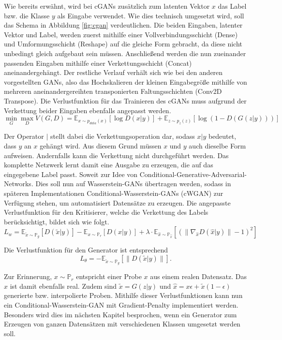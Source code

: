 Wie bereits erwähnt, wird bei cGANs zusätzlich zum latenten Vektor $x$ das Label
bzw. die Klasse $y$ als Eingabe verwendet. Wie dies technisch umgesetzt wird,
soll das Schema in Abbildung \ref{fig:cgan} verdeutlichen. Die beiden Eingaben,
latenter Vektor und Label, werden zuerst mithilfe einer Vollverbindungsschicht
(Dense) und Umformungsschicht (Reshape) auf die gleiche Form gebracht, da diese
nicht unbedingt gleich aufgebaut sein müssen. Anschließend werden die nun
zueinander passenden Eingaben mithilfe einer Verkettungsschicht (Concat)
aneinandergehängt. Der restliche Verlauf verhält sich wie bei den anderen
vorgestellten GANs, also das Hochskalieren der kleinen Eingabegröße mithilfe von
mehreren aneinandergereihten transponierten Faltungsschichten (Conv2D
Transpose). Die Verlustfunktion für das Trainieren des cGANs muss aufgrund der
Verkettung beider Eingaben ebenfalls angepasst werden. 
\[
\min_G \max_D V(G, D) = \mathbb{E}_{x \sim p_{data}(x)}\left[ \log D(x \lvert y) \right] + \mathbb{E}_{z \sim p_z(z)}\left[ \log (1 - D(G(z \lvert y))) \right]
\]

Der Operator $\lvert$ stellt dabei die Verkettungsoperation dar, sodass $x
\lvert y$ bedeutet, dass $y$ an $x$ gehängt wird. Aus diesem Grund müssen $x$
und $y$ auch dieselbe Form aufweisen. Andernfalls kann die Verkettung nicht
durchgeführt werden. Das komplette Netzwerk lernt damit eine Ausgabe zu
erzeugen, die auf das eingegebene Label passt. Soweit zur Idee von
Conditional-Generative-Adversarial-Networks. Dies soll nun auf Wasserstein-GANs
übertragen werden, sodass in späteren Implementationen
Conditional-Wasserstein-GANs (cWGAN) zur Verfügung stehen, um automatisiert
Datensätze zu erzeugen. Die angepasste Verlustfunktion für den Kritisierer,
welche die Verkettung des Labels berücksichtigt, bildet sich wie folgt.
\[
L_w = \mathbb{E}_{\tilde{x} \sim \mathbb{P}_g}\left[D(\tilde{x} \lvert y)\right] -
    \mathbb{E}_{x \sim \mathbb{P}_r}\left[D(x \lvert y)\right] +
    \lambda \cdot \mathbb{E}_{\hat{x} \sim \mathbb{P}_{\hat{x}}}\left[(\|\nabla_{\hat{x}} D(\hat{x} \lvert y)\| - 1)^2\right]
\]

Die Verlustfunktion für den Generator ist entsprechend
\[
L_\theta = - \mathbb{E}_{\tilde{x} \sim \mathbb{P}_g} \left[\| D(\tilde{x} \lvert y) \|\right].
\]

Zur Erinnerung, $x \sim \mathbb{P}_r$ entspricht einer Probe $x$ aus einem
realen Datensatz. Das $x$ ist damit ebenfalls real. Zudem sind $\tilde{x} = G(z
\lvert y)$ und $\hat{x} = x \epsilon + \tilde{x} (1 - \epsilon)$ generierte bzw.
interpolierte Proben. Mithilfe dieser Verlustfunktionen kann nun ein
Conditional-Wasserstein-GAN mit Gradient-Penalty implementiert werden. Besonders
wird dies im nächsten Kapitel besprochen, wenn ein Generator zum Erzeugen von
ganzen Datensätzen mit verschiedenen Klassen umgesetzt werden soll.

